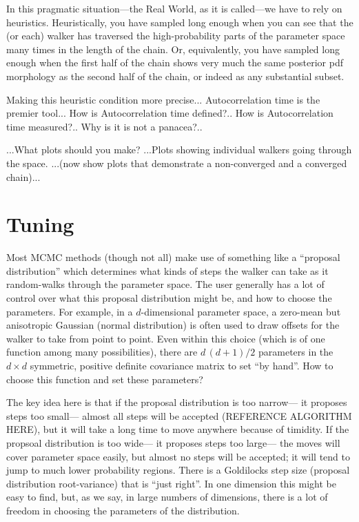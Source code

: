 \documentclass[12pt,twoside,pdftex]{article}
\begin{document}
In this pragmatic situation---the Real World, as it is called---we have to rely on heuristics.
Heuristically, you have sampled long enough when you can see
that the (or each) walker has traversed the high-probability parts of
the parameter space many times in the length of the chain.
Or, equivalently, you have sampled long enough when the first half of
the chain shows very much the same posterior pdf morphology as the
second half of the chain, or indeed as any substantial subset.

Making this heuristic condition more precise...
Autocorrelation time is the premier tool...
How is Autocorrelation time defined?..
How is Autocorrelation time measured?..
Why is it is not a panacea?..

...What plots should you make?
...Plots showing individual walkers going through the space.
...(now show plots that demonstrate a non-converged and a converged chain)...

\section{Tuning}


Most MCMC methods
  (though not all)
  make use of something like a ``proposal distribution''
  which determines what kinds of steps the walker can take
  as it random-walks through the parameter space.
The user generally has a lot of control over what this proposal distribution might be,
  and how to choose the parameters.
For example, in a $d$-dimensional parameter space, %
  a zero-mean but anisotropic Gaussian (normal distribution)
  is often used to draw offsets for the walker to take from point to point.
Even within this choice (which is of one function among many possibilities),
  there are $d\,(d+1)/2$ parameters in the $d\times d$ symmetric, positive definite covariance matrix
  to set ``by hand''.
How to choose this function and set these parameters?

The key idea here is that if the proposal distribution is too narrow---%
  it proposes steps too small---%
  almost all steps will be accepted (REFERENCE ALGORITHM HERE),
  but it will take a long time to move anywhere because of timidity.
If the propsoal distribution is too wide---%
  it proposes steps too large---%
  the moves will cover parameter space easily,
  but almost no steps will be accepted;
  it will tend to jump to much lower probability regions.
There is a Goldilocks step size (proposal distribution root-variance) that is ``just right''.
In one dimension this might be easy to find,
  but, as we say, in large numbers of dimensions,
  there is a lot of freedom in choosing the parameters of the distribution.
  
\end{document}

